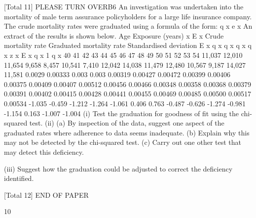 \documentclass[a4paper,12pt]{article}
\begin{document}
\begin{enumerate}

[Total 11]
PLEASE TURN OVERB6
An investigation was undertaken into the mortality of male term assurance
policyholders for a large life insurance company. The crude mortality rates were
graduated using a formula of the form:
q x
e
x
An extract of the results is shown below.
Age Exposure
(years)
x E x
Crude
mortality rate
Graduated
mortality rate
Standardised
deviation
E x q x
q x
q x
q x
z x
E x q x 1 q x
40
41
42
43
44
45
46
47
48
49
50
51
52
53
54
11,037
12,010
11,654
9,658
8,457
10,541
7,410
12,042
14,038
11,479
12,480
10,567
9,187
14,027
11,581
0.0029
0.00333
0.003
0.003
0.00319
0.00427
0.00472
0.00399
0.00406
0.00375
0.00409
0.00407
0.00512
0.00456
0.00466
0.00348
0.00358
0.00368
0.00379
0.00391
0.00402
0.00415
0.00428
0.00441
0.00455
0.00469
0.00485
0.00500
0.00517
0.00534
-1.035
-0.459
-1.212
-1.264
-1.061
0.406
0.763
-0.487
-0.626
-1.274
-0.981
-1.154
0.163
-1.007
-1.004
(i) Test the graduation for goodness of fit using the chi-squared test.
(ii) (a) By inspection of the data, suggest one aspect of the graduated rates
where adherence to data seems inadequate.
(b) Explain why this may not be detected by the chi-squared test.
(c) Carry out one other test that may detect this deficiency.


(iii)
Suggest how the graduation could be adjusted to correct the deficiency
identified.

[Total 12]
END OF PAPER

 10


\end{enumerate}
\end{document}
